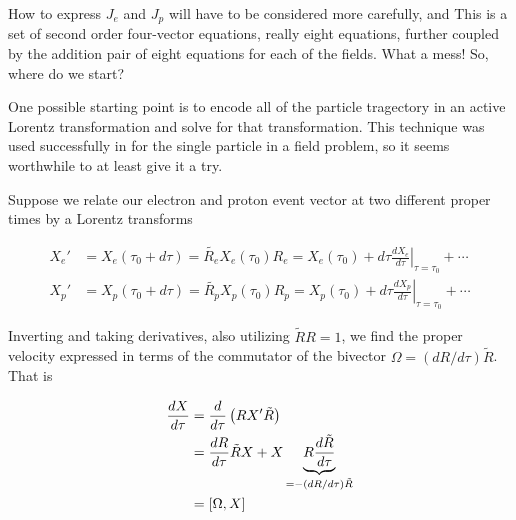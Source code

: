 How to express $J_e$ and $J_p$ will have to be considered more carefully, and 
This is a set of second order four-vector equations, really eight equations, further coupled by the addition pair of eight equations for each of the fields.  What a mess!  So, where do we start?

One possible starting point is to encode all of the particle tragectory in an active Lorentz transformation and solve for that transformation.  This technique was used successfully in \cite{doran2003gap} for the single particle in a field problem, so it seems worthwhile to at least give it a try.

Suppose we relate our electron and proton event vector at two different proper times by a Lorentz transforms

\begin{align*}
X_e' &= X_e(\tau_0 + d\tau) = \tilde{R_e} X_e(\tau_0) R_e = X_e(\tau_0) + d\tau {\left. \frac{dX_e}{d\tau} \right\vert}_{\tau = \tau_0} + \cdots \\
X_p' &= X_p(\tau_0 + d\tau) = \tilde{R_p} X_p(\tau_0) R_p = X_p(\tau_0) + d\tau {\left. \frac{dX_p}{d\tau} \right\vert}_{\tau = \tau_0} + \cdots
\end{align*}

%
Inverting and taking derivatives, also utilizing $\tilde{R}{R} = 1$, we find the proper velocity expressed in terms of the commutator of the bivector $\Omega = (dR/d\tau) \tilde{R}$.   That is

\begin{align*}
\frac{dX}{d\tau} 
&= \frac{d}{d\tau} \left( R X' \tilde{R} \right) \\
&= \frac{dR }{d\tau} \tilde{R} X + X \underbrace{R \frac{d\tilde{R}}{d\tau}}_{= - (dR/d\tau) \tilde{R}} \\
&= \left[{ \Omega },{X}\right]
\end{align*}



\EndArticle
